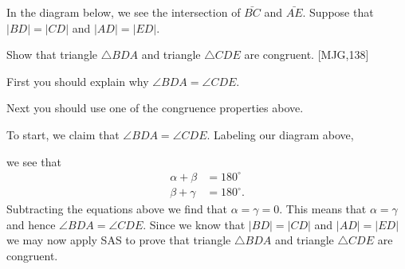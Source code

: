 \documentclass[instructornotes]{ximera}
\begin{document}
\begin{problem}\label{18} 
In the diagram below, we see the intersection of $\bar{BC}$ and
$\bar{AE}$. Suppose that $\left\vert BD\right\vert =\left\vert
CD\right\vert $ and $\left\vert AD\right\vert =\left\vert
ED\right\vert $.
\begin{image}
\end{image}
Show that triangle $\triangle BDA$ and triangle $\triangle CDE$ are
congruent. [MJG,138]

\begin{hint}
First you should explain why $\angle BDA = \angle CDE$.
\end{hint}
\begin{hint}
Next you should use one of the congruence properties above. 
\end{hint}
\begin{freeResponse}
To start, we claim that $\angle BDA = \angle CDE$. Labeling our
diagram above,
\begin{image}
\end{image}
we see that 
\begin{align*}
\alpha+\beta &= 180^\circ\\
\beta + \gamma &= 180^\circ.
\end{align*}
Subtracting the equations above we find that $\alpha=\gamma = 0$.
This means that $\alpha = \gamma$ and hence $\angle BDA = \angle
CDE$. Since we know that $\left\vert BD\right\vert =\left\vert
CD\right\vert $ and $\left\vert AD\right\vert =\left\vert
ED\right\vert $ we may now apply SAS to prove that triangle $\triangle
BDA$ and triangle $\triangle CDE$ are congruent.
\end{freeResponse}

\end{problem}
\end{document}

